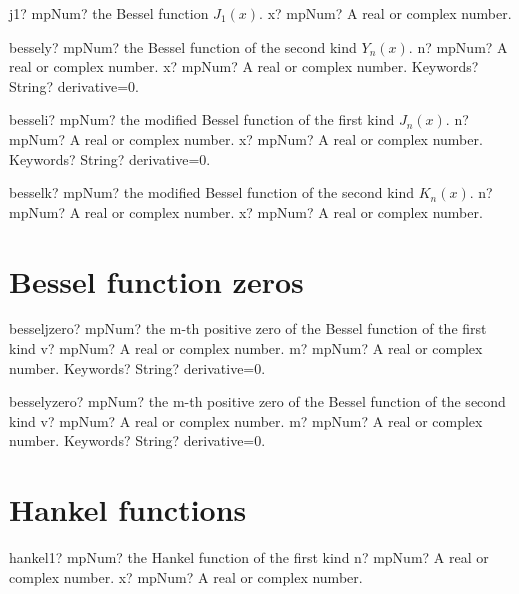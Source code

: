 \documentclass[12pt,a4paper,openany]{book}
\begin{document}
\begin{mpFunctionsExtract}
\mpFunctionOne
{j1? mpNum? the Bessel function $J_1(x)$.}
{x? mpNum? A real or complex number.}
\end{mpFunctionsExtract}

\begin{mpFunctionsExtract}
\mpFunctionThree
{bessely? mpNum? the Bessel function of the second kind $Y_n(x)$.}
{n? mpNum? A real or complex number.}
{x? mpNum? A real or complex number.}
{Keywords? String? derivative=0.}
\end{mpFunctionsExtract}

\begin{mpFunctionsExtract}
\mpFunctionThree
{besseli? mpNum? the modified Bessel function of the first kind $J_n(x)$.}
{n? mpNum? A real or complex number.}
{x? mpNum? A real or complex number.}
{Keywords? String? derivative=0.}
\end{mpFunctionsExtract}

\begin{mpFunctionsExtract}
\mpFunctionTwo
{besselk? mpNum? the modified Bessel function of the second kind $K_n(x)$.}
{n? mpNum? A real or complex number.}
{x? mpNum? A real or complex number.}
\end{mpFunctionsExtract}

\section{Bessel function zeros}

\begin{mpFunctionsExtract}
\mpFunctionThree
{besseljzero? mpNum? the m-th positive zero of the Bessel function of the first kind}
{v? mpNum? A real or complex number.}
{m? mpNum? A real or complex number.}
{Keywords? String? derivative=0.}
\end{mpFunctionsExtract}

\begin{mpFunctionsExtract}
\mpFunctionThree
{besselyzero? mpNum? the m-th positive zero of the Bessel function of the second kind}
{v? mpNum? A real or complex number.}
{m? mpNum? A real or complex number.}
{Keywords? String? derivative=0.}
\end{mpFunctionsExtract}

\section{Hankel functions}

\begin{mpFunctionsExtract}
\mpFunctionTwo
{hankel1? mpNum? the Hankel function of the first kind}
{n? mpNum? A real or complex number.}
{x? mpNum? A real or complex number.}
\end{mpFunctionsExtract}
\end{document}
